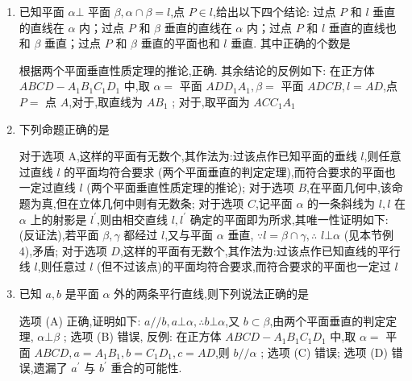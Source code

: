 \begin{enumerate}
    \item 已知平面 $\alpha  \bot$ 平面 $\beta,\alpha  \cap  \beta  = l$,点 $P \in  l$,给出以下四个结论: 过点 $P$ 和 $l$ 垂直的直线在 $\alpha$ 内；过点 $P$ 和 $\beta$ 垂直的直线在 $\alpha$ 内；过点 $P$ 和 $l$ 垂直的直线也和 $\beta$ 垂直；过点 $P$ 和 $\beta$ 垂直的平面也和 $l$ 垂直. 其中正确的个数是 
    \begin{jieda}
        根据两个平面垂直性质定理的推论,正确. 其余结论的反例如下: 在正方体 ${ABCD} - {A}_{1}{B}_{1}{C}_{1}{D}_{1}$ 中,取 $\alpha  =$ 平面 ${AD}{D}_{1}{A}_{1},\beta  =$ 平面 ${ADCB},l = {AD}$,点 $P =$ 点 $A$,对于,取直线为 $A{B}_{1}$ ; 对于,取平面为 ${AC}{C}_{1}{A}_{1}$
    \end{jieda}
    \item 下列命题正确的是
    \begin{jieda}
        对于选项 A,这样的平面有无数个,其作法为:过该点作已知平面的垂线 $l$,则任意过直线 $l$ 的平面均符合要求 (两个平面垂直的判定定理),而符合要求的平面也一定过直线 $l$ (两个平面垂直性质定理的推论); 对于选项 $B$,在平面几何中,该命题为真,但在立体几何中则有无数条; 对于选项 $C$,记平面 $\alpha$ 的一条斜线为 $l,l$ 在 $\alpha$ 上的射影是 ${l}^{\prime }$,则由相交直线 $l,{l}^{\prime }$ 确定的平面即为所求,其唯一性证明如下: (反证法),若平面 $\beta,\gamma$ 都经过 $l$,又与平面 $\alpha$ 垂直, $\because l = \beta  \cap  \gamma,\therefore$  $l\bot \alpha$ (见本节例 4),矛盾; 对于选项 $D$,这样的平面有无数个,其作法为:过该点作已知直线的平行线 $l$,则任意过 $l$ (但不过该点)的平面均符合要求,而符合要求的平面也一定过 $l$
    \end{jieda}
    \item 已知 $a,b$ 是平面 $\alpha$ 外的两条平行直线,则下列说法正确的是
    \begin{jieda}
    选项 (A) 正确,证明如下: $a//b,a\bot \alpha,\therefore b\bot \alpha$,又 $b \subset  \beta$,由两个平面垂直的判定定理, $\alpha \bot \beta$ ; 选项 (B) 错误, 反例: 在正方体 ${ABCD} - {A}_{1}{B}_{1}{C}_{1}{D}_{1}$ 中,取 $\alpha  =$ 平面 ${ABCD},a = {A}_{1}{B}_{1},b = {C}_{1}{D}_{1},c = {AD}$,则 $b//\alpha$ ; 选项 (C) 错误; 选项 (D) 错误,遗漏了 ${a}^{\prime }$ 与 ${b}^{\prime }$ 重合的可能性.

\end{jieda}
\end{enumerate}
